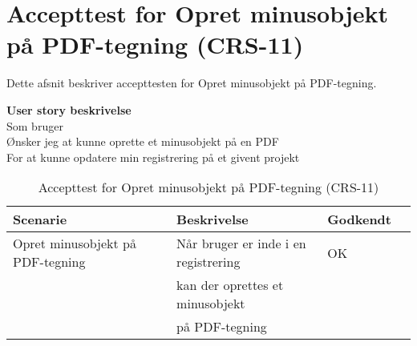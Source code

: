 \section{Accepttest for Opret minusobjekt på PDF-tegning (CRS-11)}
Dette afsnit beskriver accepttesten for Opret minusobjekt på PDF-tegning.

\textbf{User story beskrivelse} \\
Som bruger \\
Ønsker jeg at kunne oprette et minusobjekt på en PDF \\
For at kunne opdatere min registrering på et givent projekt

\begin{table}[H]
	\centering
	\begin{tabular}{|ll|l|ll|} \hline
		\textbf{Scenarie} &  & \textbf{Beskrivelse}&  \textbf{Godkendt}&  \\ \hline
		Opret minusobjekt på PDF-tegning&  &  Når bruger er inde i en registrering &  OK&  \\
		& & kan der oprettes et minusobjekt& & \\ 
		& & på PDF-tegning& & \\ \hline
	\end{tabular}
	\caption{Accepttest for Opret minusobjekt på PDF-tegning (CRS-11)}
	\label{AcceptMinus}
\end{table}

\clearpage